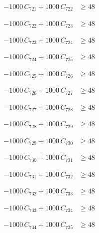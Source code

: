 \documentclass[a4paper,11pt]{article}
\begin{document}
\begin{align}
-1000\,C_{721} + 1000\,C_{722} &\geq 48 \nonumber
\end{align}

\begin{align}
-1000\,C_{722} + 1000\,C_{723} &\geq 48 \nonumber
\end{align}

\begin{align}
-1000\,C_{723} + 1000\,C_{724} &\geq 48 \nonumber
\end{align}

\begin{align}
-1000\,C_{724} + 1000\,C_{725} &\geq 48 \nonumber
\end{align}

\begin{align}
-1000\,C_{725} + 1000\,C_{726} &\geq 48 \nonumber
\end{align}

\begin{align}
-1000\,C_{726} + 1000\,C_{727} &\geq 48 \nonumber
\end{align}

\begin{align}
-1000\,C_{727} + 1000\,C_{728} &\geq 48 \nonumber
\end{align}

\begin{align}
-1000\,C_{728} + 1000\,C_{729} &\geq 48 \nonumber
\end{align}

\begin{align}
-1000\,C_{729} + 1000\,C_{730} &\geq 48 \nonumber
\end{align}

\begin{align}
-1000\,C_{730} + 1000\,C_{731} &\geq 48 \nonumber
\end{align}

\begin{align}
-1000\,C_{731} + 1000\,C_{732} &\geq 48 \nonumber
\end{align}

\begin{align}
-1000\,C_{732} + 1000\,C_{733} &\geq 48 \nonumber
\end{align}

\begin{align}
-1000\,C_{733} + 1000\,C_{734} &\geq 48 \nonumber
\end{align}

\begin{align}
-1000\,C_{734} + 1000\,C_{735} &\geq 48 \nonumber
\end{align}
\end{document}
